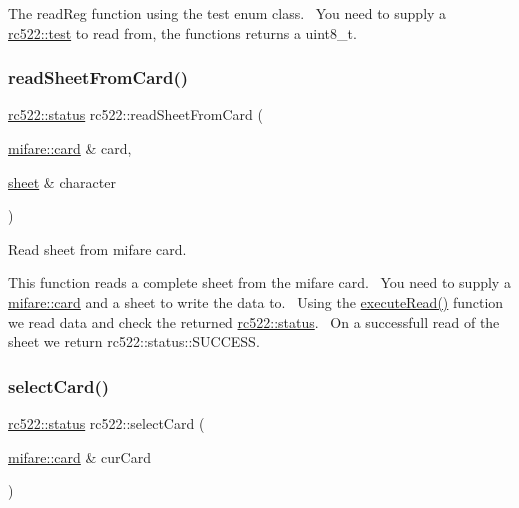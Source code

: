 The read\+Reg function using the test enum class.~\newline
You need to supply a \hyperlink{classrc522_a9589917c9bbcd18ea9c7d86c7ec565bd}{rc522\+::test} to read from, the functions returns a uint8\+\_\+t. \mbox{\label{classrc522_ad265d81264eecf2124ad224c89d6c8e7}} 
\subsubsection{\texorpdfstring{read\+Sheet\+From\+Card()}{readSheetFromCard()}}
{\footnotesize\ttfamily \hyperlink{classspiReader_a4bcf984823c38cf4841ebf619e788790}{rc522\+::status} rc522\+::read\+Sheet\+From\+Card (\begin{DoxyParamCaption}\item[{\hyperlink{classmifare_1_1card}{mifare\+::card} \&}]{card,  }\item[{\hyperlink{classsheet}{sheet} \&}]{character }\end{DoxyParamCaption})}



Read sheet from mifare card. 

This function reads a complete sheet from the mifare card.~\newline
You need to supply a \hyperlink{classmifare_1_1card}{mifare\+::card} and a sheet to write the data to.~\newline
Using the \hyperlink{classrc522_aa0eeb1eedf5ca47a44cab85a387156f3}{execute\+Read()} function we read data and check the returned \hyperlink{classspiReader_a4bcf984823c38cf4841ebf619e788790}{rc522\+::status}.~\newline
On a successfull read of the sheet we return rc522\+::status\+::\+S\+U\+C\+C\+E\+SS. \mbox{\label{classrc522_a5016ad241df63301c261709debcb274b}} 
\subsubsection{\texorpdfstring{select\+Card()}{selectCard()}}
{\footnotesize\ttfamily \hyperlink{classspiReader_a4bcf984823c38cf4841ebf619e788790}{rc522\+::status} rc522\+::select\+Card (\begin{DoxyParamCaption}\item[{\hyperlink{classmifare_1_1card}{mifare\+::card} \&}]{cur\+Card }\end{DoxyParamCaption})}



